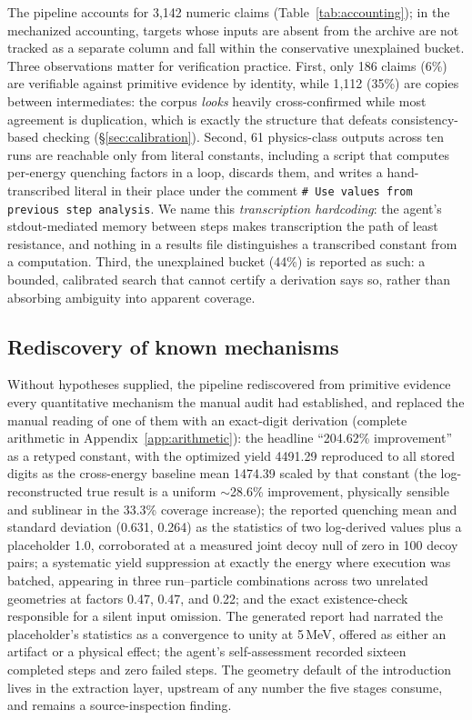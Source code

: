 \documentclass{article}
\begin{document}
The pipeline accounts for 3{,}142 numeric claims (Table~\ref{tab:accounting}); in the mechanized accounting, targets whose inputs are absent from the archive are not tracked as a separate column and fall within the conservative unexplained bucket. Three observations matter for verification practice. First, only 186 claims (6\%) are verifiable against primitive evidence by identity, while 1{,}112 (35\%) are copies between intermediates: the corpus \emph{looks} heavily cross-confirmed while most agreement is duplication, which is exactly the structure that defeats consistency-based checking (\S\ref{sec:calibration}). Second, 61 physics-class outputs across ten runs are reachable only from literal constants, including a script that computes per-energy quenching factors in a loop, discards them, and writes a hand-transcribed literal in their place under the comment \texttt{\# Use values from previous step analysis}. We name this \emph{transcription hardcoding}: the agent's stdout-mediated memory between steps makes transcription the path of least resistance, and nothing in a results file distinguishes a transcribed constant from a computation. Third, the unexplained bucket (44\%) is reported as such: a bounded, calibrated search that cannot certify a derivation says so, rather than absorbing ambiguity into apparent coverage.

\subsection{Rediscovery of known mechanisms}
\label{sec:rediscovery}

Without hypotheses supplied, the pipeline rediscovered from primitive evidence every quantitative mechanism the manual audit had established, and replaced the manual reading of one of them with an exact-digit derivation (complete arithmetic in Appendix~\ref{app:arithmetic}): the headline ``204.62\% improvement'' as a retyped constant, with the optimized yield 4491.29 reproduced to all stored digits as the cross-energy baseline mean 1474.39 scaled by that constant (the log-reconstructed true result is a uniform $\sim$28.6\% improvement, physically sensible and sublinear in the 33.3\% coverage increase); the reported quenching mean and standard deviation (0.631, 0.264) as the statistics of two log-derived values plus a placeholder 1.0, corroborated at a measured joint decoy null of zero in 100 decoy pairs; a systematic yield suppression at exactly the energy where execution was batched, appearing in three run--particle combinations across two unrelated geometries at factors 0.47, 0.47, and 0.22; and the exact existence-check responsible for a silent input omission. The generated report had narrated the placeholder's statistics as a convergence to unity at 5\,MeV, offered as either an artifact or a physical effect; the agent's self-assessment recorded sixteen completed steps and zero failed steps. The geometry default of the introduction lives in the extraction layer, upstream of any number the five stages consume, and remains a source-inspection finding.
\end{document}
